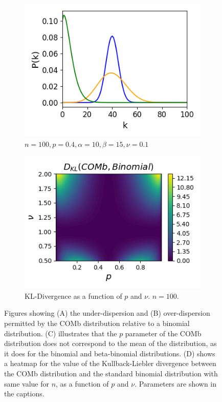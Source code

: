 \begin{figure}[p]
        \begin{subfigure}[h]{0.5\linewidth}
          \includegraphics[width=\textwidth]{figures/conway_maxwell/comb_skewed.png}
          \caption{$n=100, p=0.4, \alpha=10, \beta=15, \nu=0.1$}
          \label{fig:comb_skewed}
        \end{subfigure}
        \begin{subfigure}[h]{0.5\linewidth}
          \includegraphics[width=\textwidth]{figures/conway_maxwell/comb_bin_dkl.png}
          \caption{KL-Divergence as a function of $p$ and $\nu$. $n=100$.}
          \label{fig:comb_bin_dkl}
        \end{subfigure}
        \caption{Figures showing (A) the under-dispersion and (B) over-dispersion permitted by the COMb distribution relative to a binomial distribution. (C) illustrates that the $p$ parameter of the COMb distribution does not correspond to the mean of the distribution, as it does for the binomial and beta-binomial distributions. (D) shows a heatmap for the value of the Kullback-Liebler divergence between the COMb distribution and the standard binomial distribution with same value for $n$, as a function of $p$ and $\nu$. Parameters are shown in the captions.}
      \end{figure}


